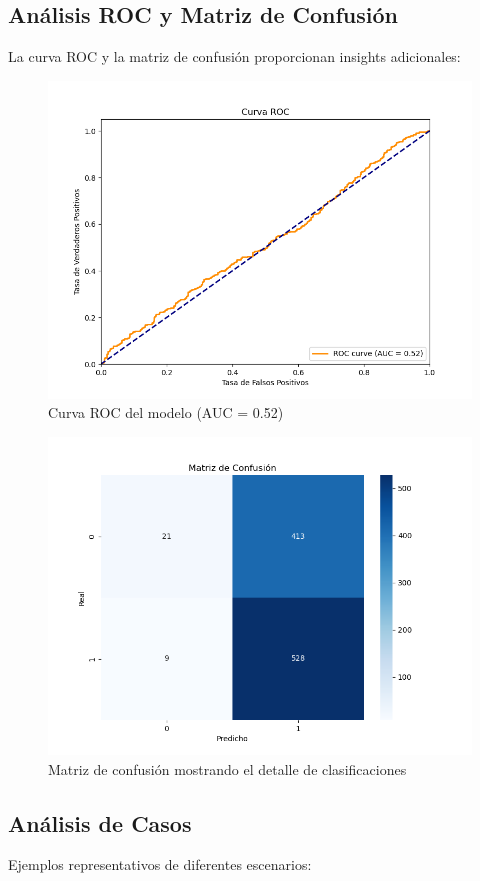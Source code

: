 \documentclass[conference]{IEEEtran}
\begin{document}
\subsection{Análisis ROC y Matriz de Confusión}
La curva ROC y la matriz de confusión proporcionan insights adicionales:

\begin{figure}[h]
\centering
\includegraphics[width=0.8\linewidth]{roc_curve.png}
\caption{Curva ROC del modelo (AUC = 0.52)}
\label{fig:roc}
\end{figure}

\begin{figure}[h]
\centering
\includegraphics[width=0.8\linewidth]{confusion_matrix.png}
\caption{Matriz de confusión mostrando el detalle de clasificaciones}
\label{fig:confusion}
\end{figure}

\subsection{Análisis de Casos}
Ejemplos representativos de diferentes escenarios:
\end{document}
